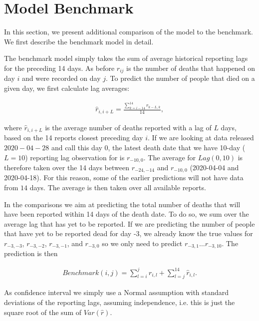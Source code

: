 \section{Model Benchmark}
In this section, we present additional comparison of the model to the benchmark. We first describe the benchmark model in detail.

The benchmark model simply takes the sum of average historical reporting lags for the preceding 14 days. As before $r_{ij}$ is the number of deaths that happened on day $i$ and were recorded on day $j$. To predict the number of people that died on a given day, we first calculate lag averages:

\begin{align}
    \hat{r}_{i, i+L} = \frac{\sum^{14}_{k=i-14} r_{k - L, k}}{14},
\end{align}

where $\hat{r}_{i, i+L}$ is the average number of deaths reported with a lag of $L$ days, based on the 14 reports closest preceding day $i$. If we are looking at data released $2020-04-28$ and call this day 0, the latest death date that we have 10-day ($L=10$) reporting lag observation for is $r_{-10,0}$. The average for $Lag(0, 10)$ is therefore taken over the 14 days between $r_{-24,-14}$ and $r_{-10,0}$ (2020-04-04 and 2020-04-18). For this reason, some of the earlier predictions will not have data from $14$ days. The average is then taken over all available reports.

In the comparisons we aim at predicting the total number of deaths that will have been reported within 14 days of the death date. To do so, we sum over the average lag that has yet to be reported. If we are predicting the number of people that have yet to be reported dead for day -3, we already know the true values for $r_{-3,-3}$, $r_{-3,-2}$, $r_{-3,-1}$, and $r_{-3,0}$ so we only need to predict $r_{-3,1}\ldots r_{-3,10}$. The prediction is then

\begin{align}
    Benchmark(i, j) = \sum_{l=i}^{j} r_{i,l}+ \sum_{l = j}^{14} \hat{r}_{i, l}.
\end{align}

As confidence interval we simply use a Normal assumption with standard deviations of the reporting lags, assuming independence, i.e. this is just the square root of the sum of $Var(\hat{r})$.

